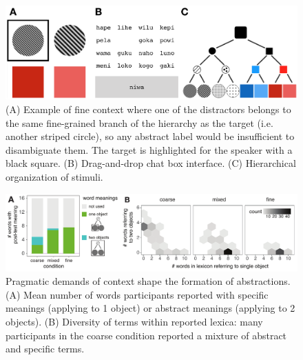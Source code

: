 \documentclass[11pt]{article}
\begin{document}
\begin{figure}[b]
\centering
\includegraphics[scale=.5]{fig.png}
\caption{(A) Example of fine context where one of the distractors belongs to the same fine-grained branch of the hierarchy as the target (i.e. another striped circle), so any abstract label would be insufficient to disambiguate them. The target is highlighted for the speaker with a black square. (B) Drag-and-drop chat box interface. (C) Hierarchical organization of stimuli.}
\label{fig:2018task}
\end{figure}

\begin{figure}[t]
\centering
\includegraphics[scale=.7]{resultsFig_v1.pdf}
\caption{ Pragmatic demands of context shape the formation of abstractions. (A) Mean number of words participants reported
with specific meanings (applying to 1 object) or abstract meanings (applying to 2 objects). (B) Diversity of terms within
reported lexica: many participants in the coarse condition reported a mixture of abstract and specific terms.}
\label{fig:modelresults}
\end{figure}

\end{document}

